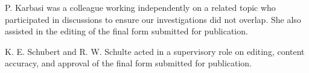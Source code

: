 {\begin{attributionList}
\begin{authorList}
        \item P. Karbasi was a colleague working independently on a related topic who participated in discussions to ensure our investigations did not overlap. She also assisted in the editing of the final form submitted for publication.
        \item K. E. Schubert and R. W. Schulte acted in a supervisory role on editing, content accuracy, and approval of the final form submitted for publication.%
    \end{authorList}%
\end{attributionList}
}
\endinput
